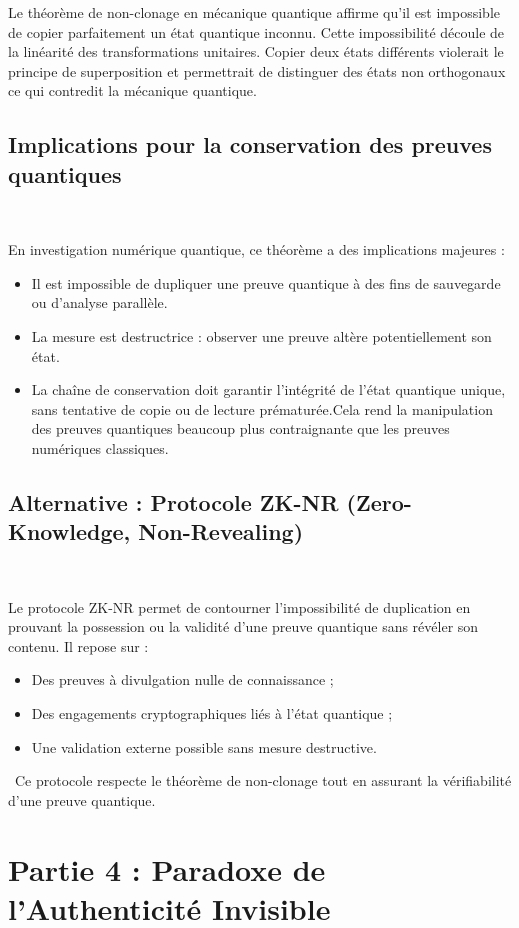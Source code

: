 \documentclass[12pt,a4paper]{report}
\begin{document}
{		Le théorème de non-clonage en mécanique quantique affirme qu’il est impossible de copier parfaitement un état quantique inconnu.  
		Cette impossibilité découle de la linéarité des transformations unitaires. Copier deux états différents violerait le principe de superposition et permettrait de distinguer des états non orthogonaux ce qui contredit la mécanique quantique.
		
		\subsection*{ Implications pour la conservation des preuves quantiques}\
		
		En investigation numérique quantique, ce théorème a des implications majeures :
		
		\begin{itemize}
		\item Il est impossible de dupliquer une preuve quantique à des fins de sauvegarde ou d'analyse parallèle.
		\item La mesure est destructrice : observer une preuve altère potentiellement son état.
		\item La chaîne de conservation doit garantir l'intégrité de l’état quantique unique, sans tentative de copie ou de lecture prématurée.Cela rend la manipulation des preuves quantiques beaucoup plus contraignante que les preuves numériques classiques.
		\end{itemize}
		\subsection*{Alternative : Protocole ZK-NR (Zero-Knowledge, Non-Revealing)}\
		
		Le protocole ZK-NR permet de contourner l’impossibilité de duplication en prouvant la possession ou la validité d’une preuve quantique sans révéler son contenu. Il repose sur :
		
		\begin{itemize}
		\item Des preuves à divulgation nulle de connaissance ;
		\item Des engagements cryptographiques liés à l’état quantique ;
		\item Une validation externe possible sans mesure destructive.
		\end{itemize}\
		Ce protocole respecte le théorème de non-clonage tout en assurant la vérifiabilité d’une preuve quantique.
		
		\section*{Partie 4 : Paradoxe de l'Authenticité Invisible}
		
}
\end{document}

